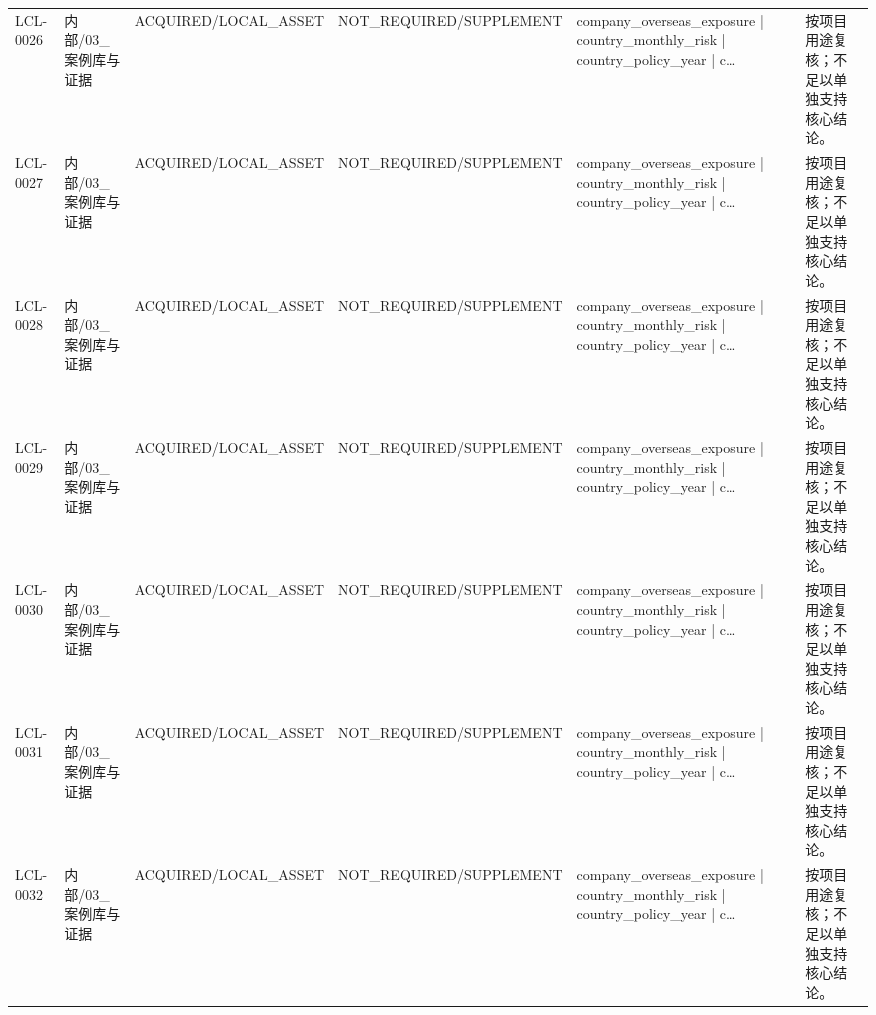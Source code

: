 \begin{landscape}
\begin{longtable}{p{1.8cm}p{2.6cm}p{2.6cm}p{2.6cm}p{4.8cm}p{7.2cm}}
LCL-0026 & 内部/\allowbreak{}03\_\allowbreak{}案例库与证据 & ACQUIRED/\allowbreak{}LOCAL\_\allowbreak{}ASSET & NOT\_\allowbreak{}REQUIRED/\allowbreak{}SUPPLEMENT & company\_\allowbreak{}overseas\_\allowbreak{}exposure | country\_\allowbreak{}monthly\_\allowbreak{}risk | country\_\allowbreak{}policy\_\allowbreak{}year | c… & 按项目用途复核；不足以单独支持核心结论。\\
LCL-0027 & 内部/\allowbreak{}03\_\allowbreak{}案例库与证据 & ACQUIRED/\allowbreak{}LOCAL\_\allowbreak{}ASSET & NOT\_\allowbreak{}REQUIRED/\allowbreak{}SUPPLEMENT & company\_\allowbreak{}overseas\_\allowbreak{}exposure | country\_\allowbreak{}monthly\_\allowbreak{}risk | country\_\allowbreak{}policy\_\allowbreak{}year | c… & 按项目用途复核；不足以单独支持核心结论。\\
LCL-0028 & 内部/\allowbreak{}03\_\allowbreak{}案例库与证据 & ACQUIRED/\allowbreak{}LOCAL\_\allowbreak{}ASSET & NOT\_\allowbreak{}REQUIRED/\allowbreak{}SUPPLEMENT & company\_\allowbreak{}overseas\_\allowbreak{}exposure | country\_\allowbreak{}monthly\_\allowbreak{}risk | country\_\allowbreak{}policy\_\allowbreak{}year | c… & 按项目用途复核；不足以单独支持核心结论。\\
LCL-0029 & 内部/\allowbreak{}03\_\allowbreak{}案例库与证据 & ACQUIRED/\allowbreak{}LOCAL\_\allowbreak{}ASSET & NOT\_\allowbreak{}REQUIRED/\allowbreak{}SUPPLEMENT & company\_\allowbreak{}overseas\_\allowbreak{}exposure | country\_\allowbreak{}monthly\_\allowbreak{}risk | country\_\allowbreak{}policy\_\allowbreak{}year | c… & 按项目用途复核；不足以单独支持核心结论。\\
LCL-0030 & 内部/\allowbreak{}03\_\allowbreak{}案例库与证据 & ACQUIRED/\allowbreak{}LOCAL\_\allowbreak{}ASSET & NOT\_\allowbreak{}REQUIRED/\allowbreak{}SUPPLEMENT & company\_\allowbreak{}overseas\_\allowbreak{}exposure | country\_\allowbreak{}monthly\_\allowbreak{}risk | country\_\allowbreak{}policy\_\allowbreak{}year | c… & 按项目用途复核；不足以单独支持核心结论。\\
LCL-0031 & 内部/\allowbreak{}03\_\allowbreak{}案例库与证据 & ACQUIRED/\allowbreak{}LOCAL\_\allowbreak{}ASSET & NOT\_\allowbreak{}REQUIRED/\allowbreak{}SUPPLEMENT & company\_\allowbreak{}overseas\_\allowbreak{}exposure | country\_\allowbreak{}monthly\_\allowbreak{}risk | country\_\allowbreak{}policy\_\allowbreak{}year | c… & 按项目用途复核；不足以单独支持核心结论。\\
LCL-0032 & 内部/\allowbreak{}03\_\allowbreak{}案例库与证据 & ACQUIRED/\allowbreak{}LOCAL\_\allowbreak{}ASSET & NOT\_\allowbreak{}REQUIRED/\allowbreak{}SUPPLEMENT & company\_\allowbreak{}overseas\_\allowbreak{}exposure | country\_\allowbreak{}monthly\_\allowbreak{}risk | country\_\allowbreak{}policy\_\allowbreak{}year | c… & 按项目用途复核；不足以单独支持核心结论。\\

\end{longtable}
\end{landscape}
